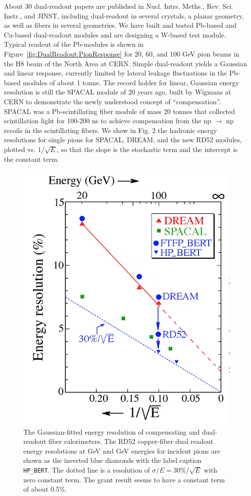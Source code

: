 About 30 dual-readout papers are published in Nucl. Intrs. Meths., Rev. Sci. Instr., and JINST, including dual-readout in several crystals, a planar geometry, as well as fibers in several geometries.
We have built and tested Pb-based and Cu-based dual-readout modules and are designing a W-based test module. Typical readout of the Pb-modules is shown in Figure~\ref{fig:DualReadout:PionResponse} for 20, 60, and 100 GeV pion beams in the H8 beam of the North Area at CERN.
Simple dual-readout yields a Gaussian and linear response, currently limited by lateral leakage fluctuations in the Pb-based modules of about 1 tonne.
The record holder for linear, Gaussian energy resolution is still the SPACAL module of 20 years ago, built by Wigmans at CERN to demonstrate the newly understood
concept of ``compensation''. SPACAL was a Pb-scintillating fiber module of mass
20 tonnes that collected scintillation light for 100-200 ns to achieve compensation
from the np $\to$ np recoils in the scintillating fibers. We show in Fig. 2 the hadronic
energy resolutions for single pions for SPACAL, DREAM, and the new RD52 modules, plotted vs. $1/\sqrt{E}$, so that the slope is the stochastic term and the intercept is the constant term.
\begin{figure}
	\centering
	\includegraphics[width=.5\textwidth]{Calorimeter/DualReadout/Eres}
	\caption{The Gaussian-fitted energy resolution of compensating and dual-readout fiber calorimeters. The RD52 copper-fiber dual readout energy resolutions at \unit[100]{GeV} and \unit[200]{GeV} energies for incident pions are shown as the inverted blue diamonds with the label caption \texttt{HP\_BERT}. The dotted line is a resolution of $\sigma/E = 30\%/\sqrt{E}$ with zero constant term. The grant result seems to have a constant term of about 0.5\%.}
	\label{fig:DualReadout:PionResolution}
\end{figure}
